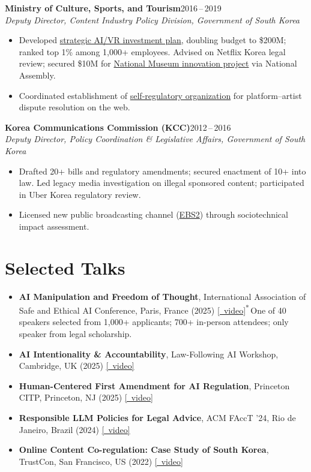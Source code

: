 \documentclass[10pt]{article}
\newcommand{\employer}[3]{%
  {\textbf{#1}\hfill\textnormal{#2}}\\
  \textit{#3}%
}
\begin{document}
\vspace{3pt}
\employer{Ministry of Culture, Sports, and Tourism}{2016\,--\,2019}{Deputy Director, Content Industry Policy Division, Government of South Korea}
\begin{itemize}
\item Developed \href{http://www.mcst.go.kr/kor/s_notice/press/pressView.jsp?pSeq=17069}{strategic AI/VR investment plan}, doubling budget to \$200M; ranked top 1\% among 1,000+ employees. Advised on Netflix Korea legal review; secured \$10M for \href{https://www.youtube.com/watch?v=LTzAHsXxtZQ}{National Museum innovation project} via National Assembly.
\item Coordinated establishment of \href{https://acw.or.kr/}{self-regulatory organization} for platform--artist dispute resolution on the web.
\end{itemize}

\vspace{3pt}
\employer{Korea Communications Commission (KCC)}{2012\,--\,2016}{Deputy Director, Policy Coordination \& Legislative Affairs, Government of South Korea}
\begin{itemize}
\item Drafted 20+ bills and regulatory amendments; secured enactment of 10+ into law. Led legacy media investigation on illegal sponsored content; participated in Uber Korea regulatory review.
\item Licensed new public broadcasting channel (\href{https://global.ebs.co.kr/global/channels/satelliteIpTv}{EBS2}) through sociotechnical impact assessment.
\end{itemize}

\section*{Selected Talks}
{\small
\begin{itemize}[itemsep=2pt]

\item \textbf{AI Manipulation and Freedom of Thought}, International Association of Safe and Ethical AI Conference, Paris, France (2025) \href{https://youtu.be/G48hDgad-gE}{[\faVideo\ video]}{\footnotesize\textsuperscript{*}\,One of 40 speakers selected from 1,000+ applicants; 700+ in-person attendees; only speaker from legal scholarship.}
\item \textbf{AI Intentionality \& Accountability}, Law-Following AI Workshop, Cambridge, UK (2025) \href{https://www.youtube.com/watch?v=0ukHp98RlcQ}{[\faVideo\ video]}
\item \textbf{Human-Centered First Amendment for AI Regulation}, Princeton CITP, Princeton, NJ (2025) \href{https://www.youtube.com/watch?v=dVgR4o3dCtc}{[\faVideo\ video]}
\item \textbf{Responsible LLM Policies for Legal Advice}, ACM FAccT '24, Rio de Janeiro, Brazil (2024) \href{https://www.youtube.com/watch?v=O-KQV_0DIVE}{[\faVideo\ video]}
\item \textbf{Online Content Co-regulation: Case Study of South Korea}, TrustCon, San Francisco, US (2022) \href{https://youtu.be/U1ShVhIDlI8}{[\faVideo\ video]}
\end{itemize}
}
\end{document}
